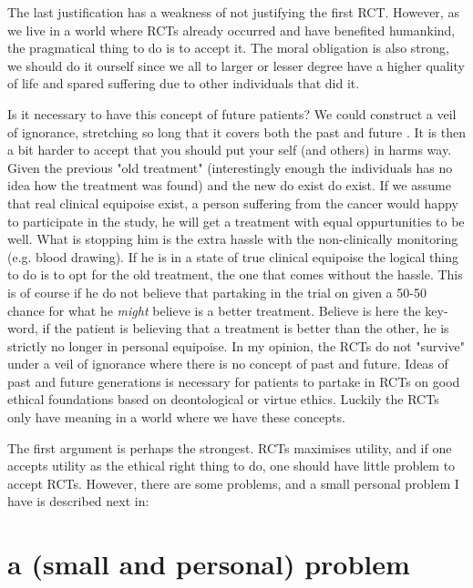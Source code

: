 \documentclass[12p]{article}
\begin{document}
The last justification has a weakness of not justifying the first RCT.
However, as we live in a world where RCTs already occurred and have benefited humankind, the pragmatical thing to do is to accept it.
The moral obligation is also strong, we should do it ourself since we all to larger or lesser degree have a higher quality of life and spared suffering due to other individuals that did it.

Is it necessary to have this concept of future patients?
We could construct a veil of ignorance, stretching so long that it covers both the past and future \cite{platonweb}.
It is then a bit harder to accept that you should put your self (and others) in harms way.
Given the previous "old treatment" (interestingly enough the individuals has no idea how the treatment was found) and the new do exist do exist.
If we assume that real clinical equipoise exist, a person suffering from the cancer would happy to participate in the study, he will get a treatment with equal oppurtunities to be well.
What is stopping him is the extra hassle with the non-clinically monitoring (e.g. blood drawing).
If he is in a state of true clinical equipoise the logical thing to do is to opt for the old treatment, the one that comes without the hassle.
This is of course if he do not believe that partaking in the trial on given a 50-50 chance for what he \emph{might} believe is a better treatment.
Believe is here the key-word, if the patient is believing that a treatment is better than the other, he is strictly no longer in personal equipoise.
In my opinion, the RCTs do not "survive" under a veil of ignorance where there is no concept of past and future.
Ideas of past and future generations is necessary for patients to partake in RCTs on good ethical foundations based on deontological or virtue ethics.
Luckily the RCTs only have meaning in a world where we have these concepts.

The first argument is perhaps the strongest.
RCTs maximises utility, and if one accepts utility as the ethical right thing to do, one should have little problem to accept RCTs.
However, there are some problems, and a small personal problem I have is described next in:

\section*{a (small and personal) problem}
\end{document}
